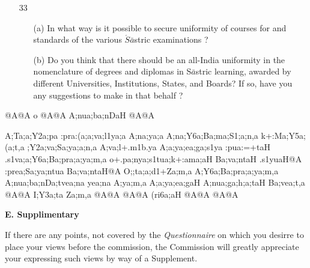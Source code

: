 {\begin{itemize}
\begin{itemize}
           \end{itemize}         
           
 \item[33] \begin{itemize}
             
            \item[(a)] In what way is it possible to secure uniformity of courses for and standards of the various $\acute{S}\bar{a}$stric examinations ?
            
            \item[(b)] Do you think that there should be an all-India uniformity in the nomenclature of degrees and diplomas in S$\bar{a}$stric learning, awarded by different Universities, Institutions, States, and Boards? If so, have you any suggestions to make in that behalf ? 
           \end{itemize}           
                      
\end{itemize}
}

\newpage

\thispagestyle{empty}
\begin{center}
{\sktf {}@A@A o @A@A A;nua;ba;nDaH
@A@A}
\end{center}

{\sktf A;Ta;a;Y2a;pa :pra:(a;a;va;l1ya;a A;na;ya;a
A;na;Y6a;Ba;ma;S1;a;n,a k+:Ma;Y5a;(a;t,a
;Y2a;va;Sa;ya;a;n,a A;va;l+.m1b.ya\ZF{,} A;a;ya;ea;ga;s1ya :pua:=+taH
.s1va;a;Y6a;Ba;pra;a;ya;m,a o+.pa;nya;s1tua;k+:ama;aH Ba;va;ntaH .s1yuaH@A :prea;Sa;ya;ntua
Ba;va;ntaH@A O;;ta;a;d1+Za;m,a A;Y6a;Ba;pra;a;ya;m,a
A;nua;ba;nDa;tvea;na\ZF{,} yea;na A;ya;m,a A;a;ya;ea;gaH
A;nua;ga;h;a;taH Ba;vea;t,a @A@A I;Y3a;ta Za;m,a @A@A\,\ZF{*}\,@A@A (ri6a;aH
@A@A\,\ZF{*}\,@A@A}


\newpage

\thispagestyle{empty}
{\rm 
\begin{center}
{\rm\bfseries E. Supplimentary}
\end{center}

If there are any points, not covered by the {\textit {Questionnaire}} on which you desirre to place your views before the commission, the Commission will greatly appreciate your expressing such views by way of a Supplement.}


